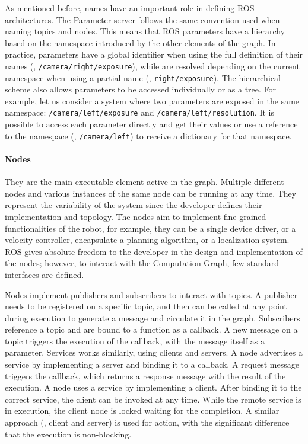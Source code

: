 As mentioned before, names have an important role in defining ROS architectures. The Parameter server follows the same convention used when naming topics and nodes. This means that ROS parameters have a hierarchy based on the namespace introduced by the other elements of the graph. In practice, parameters have a global identifier when using the full definition of their names (\eg, \texttt{/camera/right/exposure}), while are resolved depending on the current namespace when using a partial name (\eg, \texttt{right/exposure}). The hierarchical scheme also allows parameters to be accessed individually or as a tree. For example, let us consider a system where two parameters are exposed in the same namespace: \texttt{/camera/left/exposure} and \texttt{/camera/left/resolution}. It is possible to access each parameter directly and get their values or use a reference to the namespace (\ie, \texttt{/camera/left}) to receive a dictionary for that namespace.

\paragraph{Nodes} They are the main executable element active in the graph. Multiple different nodes and various instances of the same node can be running at any time. They represent the variability of the system since the developer defines their implementation and topology. The nodes aim to implement fine-grained functionalities of the robot, for example, they can be a single device driver, or a velocity controller, encapsulate a planning algorithm, or a localization system. ROS gives absolute freedom to the developer in the design and implementation of the nodes; however, to interact with the Computation Graph, few standard interfaces are defined.

Nodes implement publishers and subscribers to interact with topics. A publisher needs to be registered on a specific topic, and then can be called at any point during execution to generate a message and circulate it in the graph. Subscribers reference a topic and are bound to a function as a callback. A new message on a topic triggers the execution of the callback, with the message itself as a parameter. Services works similarly, using clients and servers. A node advertises a service by implementing a server and binding it to a callback. A request message triggers the callback, which returns a response message with the result of the execution. A node uses a service by implementing a client. After binding it to the correct service, the client can be invoked at any time. While the remote service is in execution, the client node is locked waiting for the completion. A similar approach (\ie, client and server) is used for action, with the significant difference that the execution is non-blocking.

